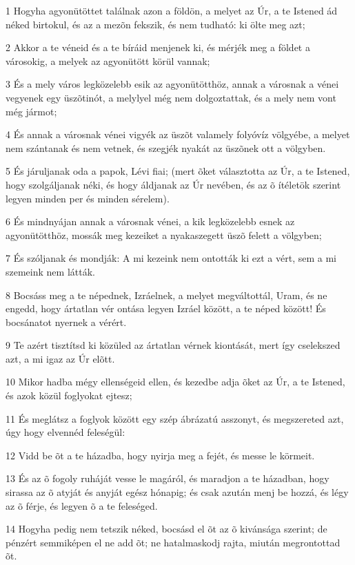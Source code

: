 \par 1 Hogyha agyonütöttet találnak azon a földön, a melyet az Úr, a te Istened ád néked birtokul, és az a mezõn fekszik, és nem tudható: ki ölte meg azt;
\par 2 Akkor a te véneid és a te bíráid menjenek ki, és mérjék meg a földet a városokig, a melyek az agyonütött körül vannak;
\par 3 És a mely város legközelebb esik az agyonütötthöz, annak a városnak a vénei vegyenek egy üszõtinót, a melylyel még nem dolgoztattak, és a mely nem vont még jármot;
\par 4 És annak a városnak vénei vigyék az üszõt valamely folyóvíz völgyébe, a melyet nem szántanak és nem vetnek, és szegjék nyakát az üszõnek ott a völgyben.
\par 5 És járuljanak oda a papok, Lévi fiai; (mert õket választotta az Úr, a te Istened, hogy szolgáljanak néki, és hogy áldjanak az Úr  nevében, és az õ ítéletök szerint legyen minden per és minden sérelem).
\par 6 És mindnyájan annak a városnak vénei, a kik legközelebb esnek az agyonütötthöz, mossák meg kezeiket a nyakaszegett üszõ felett a völgyben;
\par 7 És szóljanak és mondják: A mi kezeink nem ontották ki ezt a vért, sem a mi szemeink nem látták.
\par 8 Bocsáss meg a te népednek, Izráelnek, a melyet megváltottál, Uram, és ne engedd, hogy ártatlan vér ontása legyen Izráel között, a te néped között! És bocsánatot nyernek a vérért.
\par 9 Te azért tisztítsd ki közüled az ártatlan vérnek kiontását, mert így cselekszed azt, a mi igaz az Úr elõtt.
\par 10 Mikor hadba mégy ellenségeid ellen, és kezedbe adja õket az Úr, a te Istened, és azok közül foglyokat ejtesz;
\par 11 És meglátsz a foglyok között egy szép ábrázatú asszonyt, és megszereted azt, úgy hogy elvennéd feleségül:
\par 12 Vidd be õt a te házadba, hogy nyirja meg a fejét, és messe le körmeit.
\par 13 És az õ fogoly ruháját vesse le magáról, és maradjon a te házadban, hogy sirassa az õ atyját és anyját egész hónapig; és csak azután menj be hozzá, és légy az õ férje, és legyen õ a te feleséged.
\par 14 Hogyha pedig nem tetszik néked, bocsásd el õt az õ kivánsága szerint; de pénzért semmiképen el ne add õt; ne hatalmaskodj rajta, miután megrontottad õt.
